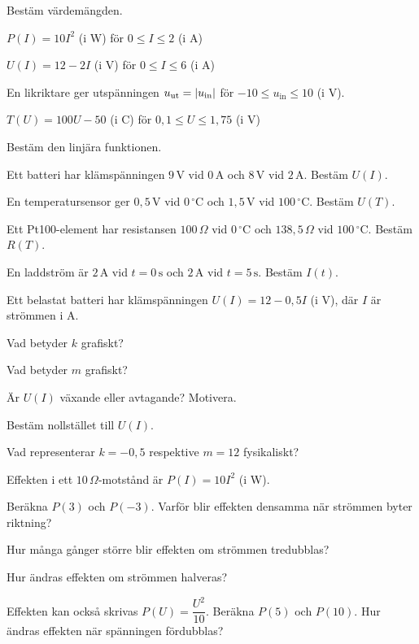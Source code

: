 Bestäm värdemängden.
\begin{parts}
  \item $P(I) = 10I^2$ (i W) för $0 \leq I \leq 2$ (i A)
  \item $U(I) = 12 - 2I$ (i V) för $0 \leq I \leq 6$ (i A)
  \item En likriktare ger utspänningen $u_{\text{ut}} = \lvert u_{\text{in}}\rvert$ för $-10 \leq
    u_{\text{in}} \leq 10$ (i V).
  \item $T(U) = 100U - 50$ (i \textdegree C) för $0{,}1 \leq U \leq 1{,}75$ (i V)
\end{parts}

Bestäm den linjära funktionen.
\begin{parts}
  \item Ett batteri har klämspänningen $9\,\text{V}$ vid $0\,\text{A}$ och $8\,\text{V}$ vid
    $2\,\text{A}$. Bestäm $U(I)$.
  \item En temperatursensor ger $0{,}5\,\text{V}$ vid $0\,^{\circ}\text{C}$ och $1{,}5\,\text{V}$ vid
    $100\,^{\circ}\text{C}$. Bestäm $U(T)$.
  \item Ett Pt100-element har resistansen $100\,\Omega$ vid $0\,^{\circ}\text{C}$ och
    $138{,}5\,\Omega$ vid $100\,^{\circ}\text{C}$. Bestäm $R(T)$.
  \item En laddström är $2\,\text{A}$ vid $t = 0\,\text{s}$ och $2\,\text{A}$ vid $t = 5\,\text{s}$.
    Bestäm $I(t)$.
\end{parts}

Ett belastat batteri har klämspänningen $U(I) = 12 - 0{,}5I$ (i V), där $I$ är strömmen i A.
\begin{parts}
  \item Vad betyder $k$ grafiskt?
  \item Vad betyder $m$ grafiskt?
  \item Är $U(I)$ växande eller avtagande? Motivera.
  \item Bestäm nollstället till $U(I)$.
  \item Vad representerar $k = -0{,}5$ respektive $m = 12$ fysikaliskt?
\end{parts}

Effekten i ett $10\,\Omega$-motstånd är $P(I) = 10I^2$ (i W).
\begin{parts}
  \item Beräkna $P(3)$ och $P(-3)$. Varför blir effekten densamma när strömmen byter riktning?
  \item Hur många gånger större blir effekten om strömmen tredubblas?
  \item Hur ändras effekten om strömmen halveras?
  \item Effekten kan också skrivas $P(U) = \dfrac{U^2}{10}$. Beräkna $P(5)$ och $P(10)$. Hur ändras
    effekten när spänningen fördubblas?
\end{parts}

